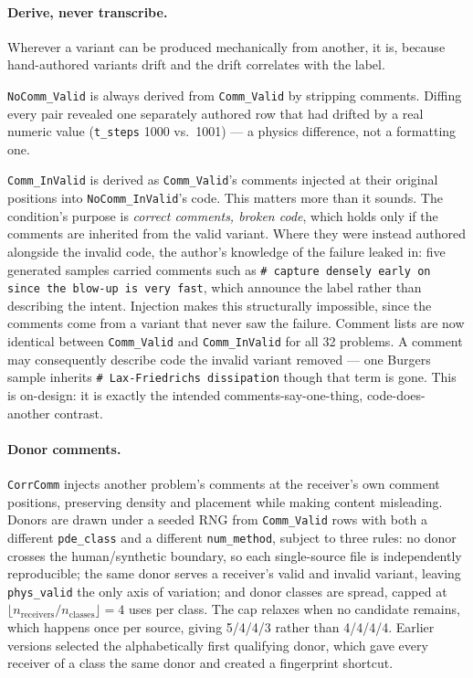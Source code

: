 \documentclass[11pt]{article}
\begin{document}
\paragraph{Derive, never transcribe.} Wherever a variant can be produced mechanically from
another, it is, because hand-authored variants drift and the drift correlates with the label.

\texttt{NoComm\_Valid} is always derived from \texttt{Comm\_Valid} by stripping comments.
Diffing every pair revealed one separately authored row that had drifted by a real numeric
value (\texttt{t\_steps} 1000 vs.\ 1001) --- a physics difference, not a formatting one.

\texttt{Comm\_InValid} is derived as \texttt{Comm\_Valid}'s comments injected at their
original positions into \texttt{NoComm\_InValid}'s code. This matters more than it sounds.
The condition's purpose is \emph{correct comments, broken code}, which holds only if the
comments are inherited from the valid variant. Where they were instead authored alongside the
invalid code, the author's knowledge of the failure leaked in: five generated samples carried
comments such as \texttt{\# capture densely early on since the blow-up is very fast}, which
announce the label rather than describing the intent. Injection makes this structurally
impossible, since the comments come from a variant that never saw the failure. Comment lists
are now identical between \texttt{Comm\_Valid} and \texttt{Comm\_InValid} for all 32 problems.
A comment may consequently describe code the invalid variant removed --- one Burgers sample
inherits \texttt{\# Lax-Friedrichs dissipation} though that term is gone. This is on-design:
it is exactly the intended comments-say-one-thing, code-does-another contrast.

\paragraph{Donor comments.} \texttt{CorrComm} injects another problem's comments at the
receiver's own comment positions, preserving density and placement while making content
misleading. Donors are drawn under a seeded RNG from \texttt{Comm\_Valid} rows with both a
different \texttt{pde\_class} and a different \texttt{num\_method}, subject to three rules: no
donor crosses the human/synthetic boundary, so each single-source file is independently
reproducible; the same donor serves a receiver's valid and invalid variant, leaving
\texttt{phys\_valid} the only axis of variation; and donor classes are spread, capped at
$\lfloor n_{\text{receivers}}/n_{\text{classes}} \rfloor = 4$ uses per class. The cap relaxes
when no candidate remains, which happens once per source, giving 5/4/4/3 rather than 4/4/4/4.
Earlier versions selected the alphabetically first qualifying donor, which gave every receiver
of a class the same donor and created a fingerprint shortcut.
\end{document}
